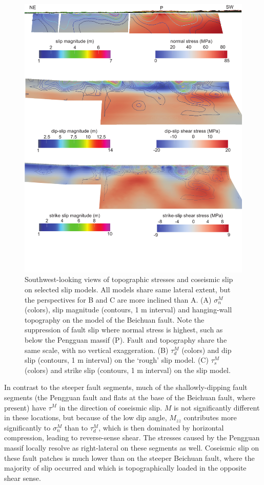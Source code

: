 \documentclass[twocolumn,jgrga]{AGUTeX}
\begin{document}
\begin{article}
\begin{figure}[htbp]
\centering
\includegraphics[width=40pc]{../figures/fault_stress_3d.pdf}
\caption{Southwest-looking views of topographic stresses and coseismic
slip on selected slip models. All models share same lateral extent, but
the perspectives for B and C are more inclined than A. (A) $\sigma_n^M$
(colors), slip magnitude (contours, 1 m interval) and hanging-wall
topography on the \citet{feng2010} model of the Beichuan
fault. Note the suppression of fault slip where normal stress is
highest, such as below the Pengguan massif (P). Fault and topography
share the same scale, with no vertical exaggeration. (B) $\tau_d^M$ (colors)
and dip slip (contours, 1 m interval) on the \citet{qi2011}
`rough' slip model. (C) $\tau_s^M$ (colors) and strike slip (contours, 1
m interval) on the \citet{qi2011} slip model.}
\label{fig:fault_stress_3d}
\end{figure}

In contrast to the steeper fault segments, much of the shallowly-dipping
fault segments (the Pengguan fault and flats at the base of the Beichuan
fault, where present) have $\tau^M$ in the direction of coseismic slip.
$M$ is not significantly different in these
locations, but because of the low dip angle, $M_{zz}$ contributes more
significantly to $\sigma^M_n$ than to $\tau^M_d$, which is then
dominated by horizontal compression, leading to reverse-sense shear.
The stresses caused by the Pengguan massif locally resolve
as right-lateral on these segments as well. Coseismic slip on these
fault patches is much lower than on the steeper Beichuan fault, where
the majority of slip occurred and which is topographically loaded in the
opposite shear sense.


\end{article}
\end{document}
